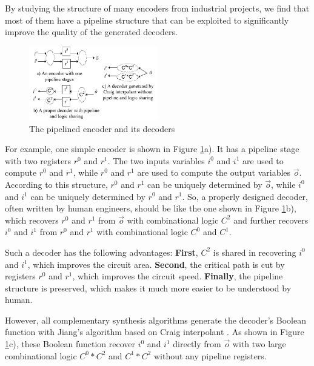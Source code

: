 \documentclass[twocolumn]{article}
\begin{document}
By studying the structure of many encoders from industrial projects,
we find that most of them have a pipeline structure that can be exploited to
significantly improve the quality of the generated decoders.

\begin{figure}[t]
\begin{center}
\includegraphics[width=0.5\textwidth]{pipeline}
\end{center}
\caption{The pipelined encoder and its decoders}
  \label{fig_pipe}
\end{figure}

For example,
one simple encoder is shown in Figure \ref{fig_pipe}a).
It has a pipeline stage with two registers $r^0$ and $r^1$.
The two inputs variables $i^0$ and $i^1$ are used to compute $r^0$ and $r^1$,
while $r^0$ and $r^1$ are used to compute the output variables $\vec{o}$.
According to this structure,
$r^0$ and $r^1$ can be uniquely determined by $\vec{o}$,
while $i^0$ and $i^1$ can be uniquely determined by $r^0$ and $r^1$.
So,
a properly designed decoder,
often written by human engineers,
should be like the one shown in Figure \ref{fig_pipe}b),
which recovers $r^0$ and $r^1$ from $\vec{o}$ with combinational logic $C^2$
and further recovers $i^0$ and $i^1$ from $r^0$ and $r^1$ with combinational logic $C^0$ and $C^1$.

Such a decoder has the following advantages:
 \textbf{First},
 $C^2$ is shared in recovering $i^0$ and $i^1$,
 which improves the circuit area.
 \textbf{Second},
 the critical path is cut by registers $r^0$ and $r^1$, 
 which improves the circuit speed.
 \textbf{Finally},
 the pipeline structure is preserved,
 which makes it much more easier to be understood by human.

However,
all complementary synthesis algorithms \cite{ShenTCAD10,ShenTCAD11,ShenTCAD12,LiuICCAD11,LiuTCAD12,TuDAC13}
generate the decoder's Boolean function with Jiang's algorithm \cite{InterpBoolFunction} 
based on Craig interpolant \cite{Craig}.
As shown in Figure \ref{fig_pipe}c),
these Boolean function recover $i^0$ and $i^1$ directly from $\vec{o}$ 
with two large combinational logic $C^0*C^2$ and $C^1*C^2$
without any pipeline registers.
\end{document}
